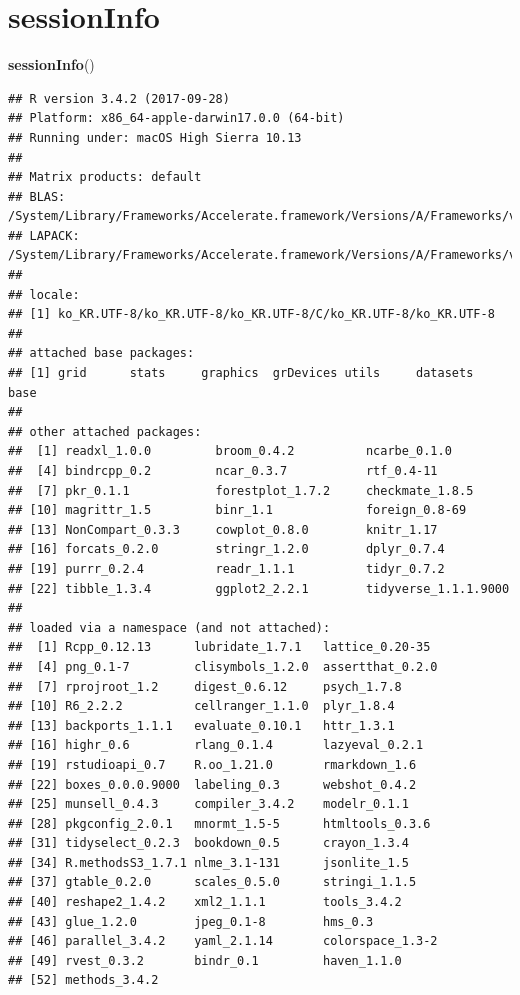 \documentclass[12pt,]{krantz}
\newenvironment{Shaded}{\begin{snugshade}}{\end{snugshade}}
\newcommand{\KeywordTok}[1]{\textcolor[rgb]{0.13,0.29,0.53}{\textbf{#1}}}
\newcommand{\NormalTok}[1]{#1}
\theoremstyle{definition}
\theoremstyle{definition}
\theoremstyle{definition}
\theoremstyle{remark}
\begin{document}
\chapter{sessionInfo}\label{sessioninfo}

\begin{Shaded}
\begin{Highlighting}[]
\KeywordTok{sessionInfo}\NormalTok{()}
\end{Highlighting}
\end{Shaded}

\begin{verbatim}
## R version 3.4.2 (2017-09-28)
## Platform: x86_64-apple-darwin17.0.0 (64-bit)
## Running under: macOS High Sierra 10.13
## 
## Matrix products: default
## BLAS: /System/Library/Frameworks/Accelerate.framework/Versions/A/Frameworks/vecLib.framework/Versions/A/libBLAS.dylib
## LAPACK: /System/Library/Frameworks/Accelerate.framework/Versions/A/Frameworks/vecLib.framework/Versions/A/libLAPACK.dylib
## 
## locale:
## [1] ko_KR.UTF-8/ko_KR.UTF-8/ko_KR.UTF-8/C/ko_KR.UTF-8/ko_KR.UTF-8
## 
## attached base packages:
## [1] grid      stats     graphics  grDevices utils     datasets  base     
## 
## other attached packages:
##  [1] readxl_1.0.0         broom_0.4.2          ncarbe_0.1.0        
##  [4] bindrcpp_0.2         ncar_0.3.7           rtf_0.4-11          
##  [7] pkr_0.1.1            forestplot_1.7.2     checkmate_1.8.5     
## [10] magrittr_1.5         binr_1.1             foreign_0.8-69      
## [13] NonCompart_0.3.3     cowplot_0.8.0        knitr_1.17          
## [16] forcats_0.2.0        stringr_1.2.0        dplyr_0.7.4         
## [19] purrr_0.2.4          readr_1.1.1          tidyr_0.7.2         
## [22] tibble_1.3.4         ggplot2_2.2.1        tidyverse_1.1.1.9000
## 
## loaded via a namespace (and not attached):
##  [1] Rcpp_0.12.13      lubridate_1.7.1   lattice_0.20-35  
##  [4] png_0.1-7         clisymbols_1.2.0  assertthat_0.2.0 
##  [7] rprojroot_1.2     digest_0.6.12     psych_1.7.8      
## [10] R6_2.2.2          cellranger_1.1.0  plyr_1.8.4       
## [13] backports_1.1.1   evaluate_0.10.1   httr_1.3.1       
## [16] highr_0.6         rlang_0.1.4       lazyeval_0.2.1   
## [19] rstudioapi_0.7    R.oo_1.21.0       rmarkdown_1.6    
## [22] boxes_0.0.0.9000  labeling_0.3      webshot_0.4.2    
## [25] munsell_0.4.3     compiler_3.4.2    modelr_0.1.1     
## [28] pkgconfig_2.0.1   mnormt_1.5-5      htmltools_0.3.6  
## [31] tidyselect_0.2.3  bookdown_0.5      crayon_1.3.4     
## [34] R.methodsS3_1.7.1 nlme_3.1-131      jsonlite_1.5     
## [37] gtable_0.2.0      scales_0.5.0      stringi_1.1.5    
## [40] reshape2_1.4.2    xml2_1.1.1        tools_3.4.2      
## [43] glue_1.2.0        jpeg_0.1-8        hms_0.3          
## [46] parallel_3.4.2    yaml_2.1.14       colorspace_1.3-2 
## [49] rvest_0.3.2       bindr_0.1         haven_1.1.0      
## [52] methods_3.4.2
\end{verbatim}
\end{document}

